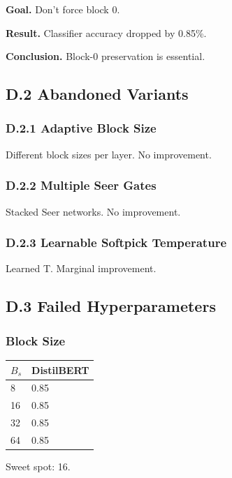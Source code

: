 \textbf{Goal.} Don't force block 0.

\textbf{Result.} Classifier accuracy dropped by 0.85\%.

\textbf{Conclusion.} Block-0 preservation is essential.

\subsection{D.2 Abandoned Variants}

\subsubsection{D.2.1 Adaptive Block Size}

Different block sizes per layer. No improvement.

\subsubsection{D.2.2 Multiple Seer Gates}

Stacked Seer networks. No improvement.

\subsubsection{D.2.3 Learnable Softpick Temperature}

Learned T. Marginal improvement.

\subsection{D.3 Failed Hyperparameters}

\subsubsection{Block Size}

\begin{table}[H]
\centering
\small
\begin{tabular}{ll}
\toprule
\textbf{$B_s$} & \textbf{DistilBERT} \\
\midrule
8 & 0.85 \\
16 & 0.85 \\
32 & 0.85 \\
64 & 0.85 \\
\bottomrule
\end{tabular}
\end{table}

Sweet spot: 16.

